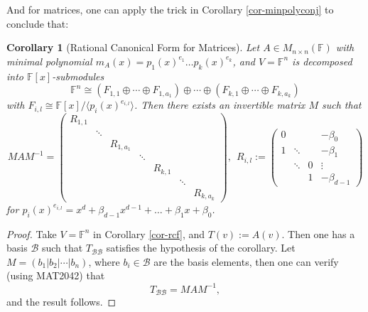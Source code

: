 \documentclass[12pt]{amsbook}
\newtheorem{corollary}[theorem]{Corollary}
\begin{document}
And for matrices, one can apply the trick in Corollary \ref{cor-minpolyconj} to conclude that:
\begin{corollary}[Rational Canonical Form for Matrices]
Let $A \in M_{n\times n}(\mathbb{F})$ with minimal polynomial
$m_A(x) = p_1(x)^{e_1} \dots p_k(x)^{e_k}$, and $V = \mathbb{F}^n$ is decomposed into $\mathbb{F}[x]$-submodules
$$\mathbb{F}^n \cong (F_{1,1} \oplus \cdots \oplus F_{1,a_1}) \oplus \cdots \oplus (F_{k,1} \oplus \cdots \oplus F_{k,a_k})$$
with $F_{i,l} \cong \mathbb{F}[x]/\langle p_i(x)^{e_{i,l}} \rangle$. Then there exists an invertible matrix $M$ such that 
    $$MAM^{-1} = \begin{pmatrix} R_{1,1} & & & & & \\
& \ddots & & & & & \\ 
& & R_{1,a_1} & & & & \\
& & & \ddots & & &\\
& & & & R_{k,1} & & \\
& & & & & \ddots & \\
& & & & & & R_{k,a_k}\end{pmatrix},\ \ R_{i,l} := \begin{pmatrix}
    0 &  &  &  -\beta_0 \\
    1 & \ddots     & &   -\beta_1 \\
    & \ddots & 0 &  \vdots \\ 
     &  & 1 & -\beta_{d-1}
\end{pmatrix}
$$
for $p_i(x)^{e_{i,l}} = x^d + \beta_{d-1}x^{d-1}+ \dots + \beta_1 x + \beta_0$.    
\end{corollary}
\begin{proof}
    Take $V = \mathbb{F}^n$ in Corollary \ref{cor-rcf}, and $T(v) := A(v)$. Then one has a basis $\mathcal{B}$ such that $T_{\mathcal{B}\mathcal{B}}$ satisfies the hypothesis of the corollary. Let $M = (b_1|b_2|\cdots|b_n)$, where $b_i \in \mathcal{B}$ are the basis elements, then one can verify (using MAT2042) that
    $$T_{\mathcal{B}\mathcal{B}} = MAM^{-1},$$
    and the result follows.
\end{proof}
\end{document}

